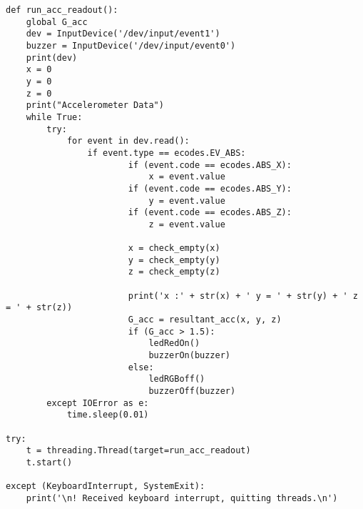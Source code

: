 \begin{verbatim}
def run_acc_readout():
    global G_acc
    dev = InputDevice('/dev/input/event1')
    buzzer = InputDevice('/dev/input/event0')
    print(dev)
    x = 0
    y = 0
    z = 0
    print("Accelerometer Data")
    while True:
        try:
            for event in dev.read():
                if event.type == ecodes.EV_ABS:
                        if (event.code == ecodes.ABS_X):
                            x = event.value
                        if (event.code == ecodes.ABS_Y):
                            y = event.value
                        if (event.code == ecodes.ABS_Z):
                            z = event.value

                        x = check_empty(x)
                        y = check_empty(y)
                        z = check_empty(z)

                        print('x :' + str(x) + ' y = ' + str(y) + ' z = ' + str(z))
                        G_acc = resultant_acc(x, y, z)
                        if (G_acc > 1.5):
                            ledRedOn()
                            buzzerOn(buzzer)
                        else:
                            ledRGBoff()
                            buzzerOff(buzzer)
        except IOError as e:
            time.sleep(0.01)

try:
    t = threading.Thread(target=run_acc_readout)
    t.start()

except (KeyboardInterrupt, SystemExit):
    print('\n! Received keyboard interrupt, quitting threads.\n')

\end{verbatim}